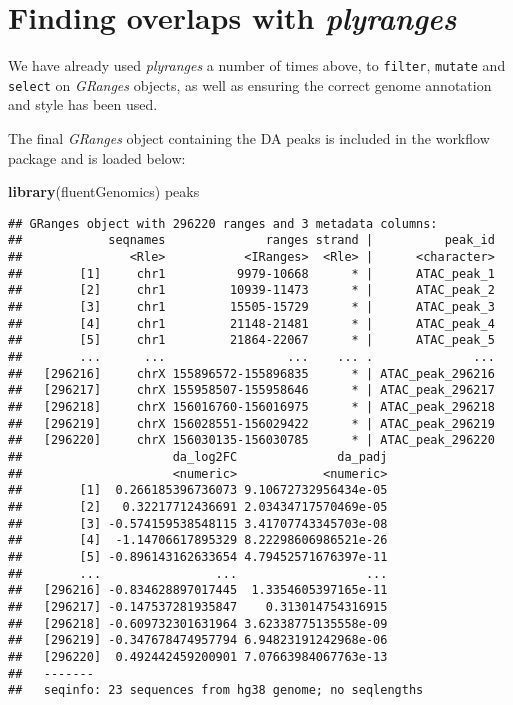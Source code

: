 \documentclass[
  9pt,
  a4paper,
]{extarticle}
\newenvironment{Shaded}{\begin{snugshade}}{\end{snugshade}}
\newcommand{\KeywordTok}[1]{\textcolor[rgb]{0.13,0.29,0.53}{\textbf{#1}}}
\newcommand{\NormalTok}[1]{#1}
\begin{document}
\hypertarget{finding-overlaps-with-plyranges}{%
\section{\texorpdfstring{Finding overlaps with \emph{plyranges}}{Finding overlaps with plyranges}}\label{finding-overlaps-with-plyranges}}

We have already used \emph{plyranges} a number of times above, to \texttt{filter}, \texttt{mutate}
and \texttt{select} on \emph{GRanges} objects, as well as ensuring the correct genome
annotation and style has been used.

The final \emph{GRanges} object containing the DA peaks is included in the workflow
package and is loaded below:

\begin{Shaded}
\begin{Highlighting}[]
\KeywordTok{library}\NormalTok{(fluentGenomics)}
\NormalTok{peaks}
\end{Highlighting}
\end{Shaded}

\begin{verbatim}
## GRanges object with 296220 ranges and 3 metadata columns:
##            seqnames              ranges strand |          peak_id
##               <Rle>           <IRanges>  <Rle> |      <character>
##        [1]     chr1          9979-10668      * |      ATAC_peak_1
##        [2]     chr1         10939-11473      * |      ATAC_peak_2
##        [3]     chr1         15505-15729      * |      ATAC_peak_3
##        [4]     chr1         21148-21481      * |      ATAC_peak_4
##        [5]     chr1         21864-22067      * |      ATAC_peak_5
##        ...      ...                 ...    ... .              ...
##   [296216]     chrX 155896572-155896835      * | ATAC_peak_296216
##   [296217]     chrX 155958507-155958646      * | ATAC_peak_296217
##   [296218]     chrX 156016760-156016975      * | ATAC_peak_296218
##   [296219]     chrX 156028551-156029422      * | ATAC_peak_296219
##   [296220]     chrX 156030135-156030785      * | ATAC_peak_296220
##                     da_log2FC              da_padj
##                     <numeric>            <numeric>
##        [1]  0.266185396736073 9.10672732956434e-05
##        [2]   0.32217712436691 2.03434717570469e-05
##        [3] -0.574159538548115 3.41707743345703e-08
##        [4]  -1.14706617895329 8.22298606986521e-26
##        [5] -0.896143162633654 4.79452571676397e-11
##        ...                ...                  ...
##   [296216] -0.834628897017445  1.3354605397165e-11
##   [296217] -0.147537281935847    0.313014754316915
##   [296218] -0.609732301631964 3.62338775135558e-09
##   [296219] -0.347678474957794 6.94823191242968e-06
##   [296220]  0.492442459200901 7.07663984067763e-13
##   -------
##   seqinfo: 23 sequences from hg38 genome; no seqlengths
\end{verbatim}
\end{document}
